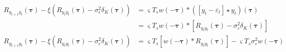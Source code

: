 \documentclass[]{article}
\newcommand{\parham}[1]{\textsf{\emph{\textbf{\textcolor{blue}{#1}}}}}
\begin{document}
\begin{align}
	R_{y_{t+1}y_t}(\boldsymbol{\tau})-\xi \left(R_{y_ty_t}(\boldsymbol{\tau})-\sigma_{\epsilon}^2  \delta_{K}\left(\boldsymbol\tau\right)\right) &=  \varsigma T_s  w(-\boldsymbol\tau)\ast (\left[y_t-\varepsilon_t \right] \star y_t)(\boldsymbol\tau)\nonumber \\
&= \varsigma T_s  w(-\boldsymbol\tau) \ast\left[R_{y_ty_t}(\boldsymbol\tau)-\sigma_{\varepsilon}^2\delta_K(\boldsymbol\tau) \right] 
\end{align}
\begin{align}
	R_{y_{t+1}y_t}(\boldsymbol{\tau}) -\xi \left(R_{y_ty_t}(\boldsymbol{\tau})-\sigma_{\epsilon}^2  \delta_{K}\left(\boldsymbol\tau\right)\right)& = \varsigma T_s \left[ w(-\boldsymbol\tau)\ast R_{y_ty_t}(\boldsymbol\tau)\right] -\varsigma T_s \sigma^2_{\varepsilon}w(-\boldsymbol\tau) 
\end{align}
\end{document}
